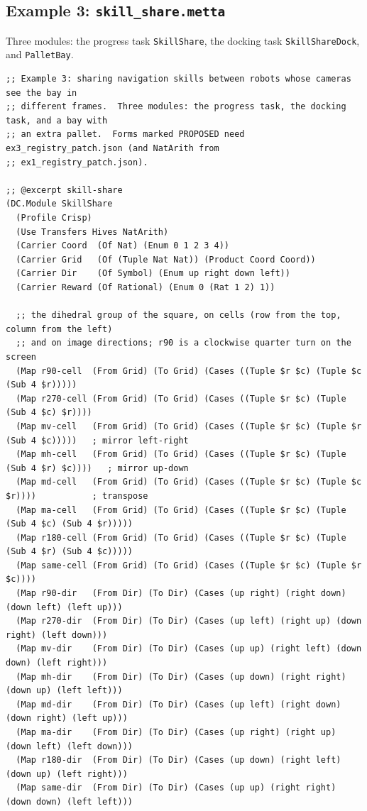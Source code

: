 \documentclass[11pt]{article}
\newcommand{\fpath}[1]{\nolinkurl{#1}}
\newcommand{\code}[1]{\texttt{#1}}
\theoremstyle{definition}
\theoremstyle{plain}
\begin{document}
\subsection{Example 3: \texorpdfstring{\fpath{skill_share.metta}}{skill\_share.metta}}
Three modules: the progress task \code{SkillShare}, the docking task \code{SkillShareDock}, and \code{PalletBay}.
\begin{lstlisting}[style=mettafull]
;; Example 3: sharing navigation skills between robots whose cameras see the bay in
;; different frames.  Three modules: the progress task, the docking task, and a bay with
;; an extra pallet.  Forms marked PROPOSED need ex3_registry_patch.json (and NatArith from
;; ex1_registry_patch.json).

;; @excerpt skill-share
(DC.Module SkillShare
  (Profile Crisp)
  (Use Transfers Hives NatArith)
  (Carrier Coord  (Of Nat) (Enum 0 1 2 3 4))
  (Carrier Grid   (Of (Tuple Nat Nat)) (Product Coord Coord))
  (Carrier Dir    (Of Symbol) (Enum up right down left))
  (Carrier Reward (Of Rational) (Enum 0 (Rat 1 2) 1))

  ;; the dihedral group of the square, on cells (row from the top, column from the left)
  ;; and on image directions; r90 is a clockwise quarter turn on the screen
  (Map r90-cell  (From Grid) (To Grid) (Cases ((Tuple $r $c) (Tuple $c (Sub 4 $r)))))
  (Map r270-cell (From Grid) (To Grid) (Cases ((Tuple $r $c) (Tuple (Sub 4 $c) $r))))
  (Map mv-cell   (From Grid) (To Grid) (Cases ((Tuple $r $c) (Tuple $r (Sub 4 $c)))))   ; mirror left-right
  (Map mh-cell   (From Grid) (To Grid) (Cases ((Tuple $r $c) (Tuple (Sub 4 $r) $c))))   ; mirror up-down
  (Map md-cell   (From Grid) (To Grid) (Cases ((Tuple $r $c) (Tuple $c $r))))           ; transpose
  (Map ma-cell   (From Grid) (To Grid) (Cases ((Tuple $r $c) (Tuple (Sub 4 $c) (Sub 4 $r)))))
  (Map r180-cell (From Grid) (To Grid) (Cases ((Tuple $r $c) (Tuple (Sub 4 $r) (Sub 4 $c)))))
  (Map same-cell (From Grid) (To Grid) (Cases ((Tuple $r $c) (Tuple $r $c))))
  (Map r90-dir   (From Dir) (To Dir) (Cases (up right) (right down) (down left) (left up)))
  (Map r270-dir  (From Dir) (To Dir) (Cases (up left) (right up) (down right) (left down)))
  (Map mv-dir    (From Dir) (To Dir) (Cases (up up) (right left) (down down) (left right)))
  (Map mh-dir    (From Dir) (To Dir) (Cases (up down) (right right) (down up) (left left)))
  (Map md-dir    (From Dir) (To Dir) (Cases (up left) (right down) (down right) (left up)))
  (Map ma-dir    (From Dir) (To Dir) (Cases (up right) (right up) (down left) (left down)))
  (Map r180-dir  (From Dir) (To Dir) (Cases (up down) (right left) (down up) (left right)))
  (Map same-dir  (From Dir) (To Dir) (Cases (up up) (right right) (down down) (left left)))


\end{lstlisting}
\end{document}
